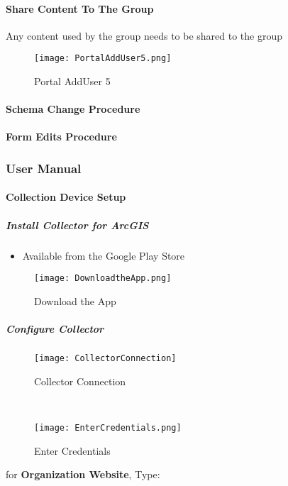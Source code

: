 \paragraph[Share Portal Content]{\Large Share Content To The Group\texorpdfstring{\\}{}}
\vspace{.5in}

\noindent Any content used by the group needs to be shared to the group
\vspace{.5in}

\begin{figure}[h!]
\centering
    \texttt{[image: PortalAddUser5.png]}
\caption{Portal AddUser 5}
\end{figure}
\clearpage
\paragraph[Schema Change Procedure]{\Large Schema Change Procedure}
\clearpage
\paragraph[Form Edits Procedure]{\Large Form Edits Procedure}
\clearpage
\subsubsection[User Manual]{\Large User Manual}
\paragraph{Collection Device Setup}
\subparagraph{Install Collector for ArcGIS}
\begin{itemize}
\item Available from the Google Play Store
\end{itemize}
\begin{figure}[h!]
\centering
    \texttt{[image: DownloadtheApp.png]}
\caption{Download the App}
\end{figure}
\clearpage
\subparagraph[Configure Collector]{\Large Configure Collector}
\begin{wrapfigure}{r}{0.5\textwidth}
\centering
\texttt{[image: CollectorConnection]}
\caption{Collector Connection}
\vspace{.25in}

\HRule \\[.4cm] %
\vspace{.25in}

    \texttt{[image: EnterCredentials.png]}
\caption{Enter Credentials}
\end{wrapfigure}
for \textbf{Organization Website}, Type:
\vspace{.5in}

